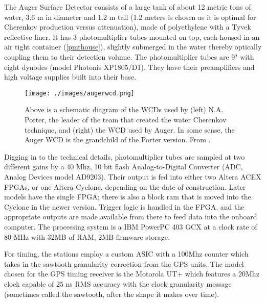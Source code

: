 
The Auger Surface Detector consists of a large tank of about 12 metric tons of water, 3.6 m in diameter and 1.2 m tall (1.2 meters is chosen as it is optimal for Cherenkov production versus attenuation), made of polyethylene with a Tyvek reflective liner. It has 3 photomultiplier tubes mounted on top, each housed in an air tight container (\autoref{pmthouse}), slightly submerged in the water thereby optically coupling them to their detection volume. The photomultiplier tubes are 9" with eight dynodes (model Photonis XP1805/D1). They have their preamplifiers and high voltage supplies built into their base. 
\begin{figure}[h!]
\begin{center}
\texttt{[image: ./images/augerwcd.png]}
\caption[Auger Surface Station Diagram]{Above is a schematic diagram of the WCDs used by (left) N.A. Porter, the leader of the team that created the water Cherenkov technique, and (right) the WCD used by Auger. In some sense, the Auger WCD is the grandchild of the Porter version. From \textcite{ultraray}.}
\label{augerwcd}
\end{center}
\end{figure}
Digging in to the technical details, photomultiplier tubes are sampled at two different gains by a 40 Mhz, 10 bit flash Analog-to-Digital Converter (ADC, Analog Devices model AD9203). Their output is fed into either two Altera ACEX FPGAs, or one Altera Cyclone, depending on the date of construction. Later models have the single FPGA; there is also a block ram that is moved into the Cyclone in the newer version. Trigger logic is handled in the FPGA, and the appropriate outputs are made available from there to feed data into the onboard computer. The processing system is a IBM PowerPC 403 GCX at a clock rate of 80 MHz with 32MB of RAM, 2MB firmware storage.

For timing, the stations employ a custom ASIC with a 100Mhz counter which takes in the sawtooth granularity correction from the GPS units. The model chosen for the GPS timing receiver is the Motorola UT+ which features a 20Mhz clock capable of 25 ns RMS accuracy with the clock granularity message (sometimes called the sawtooth, after the shape it makes over time). 

